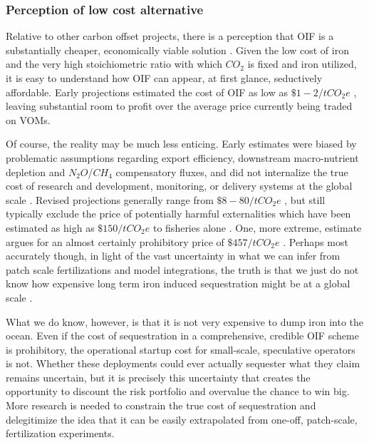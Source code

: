 \subsubsection{Perception of low cost alternative}

Relative to other carbon offset projects, there is a perception that OIF is a substantially cheaper, economically viable solution \parencite{KeithClimateStrategyCo22006,WorstallCheapWayDeal2012}. Given the low cost of iron and the very high stoichiometric ratio with which $CO_2$ is fixed and iron utilized, it is easy to understand how OIF can appear, at first glance, seductively affordable. Early projections estimated the cost of OIF as low as $\$1-2/tCO_2e$ \parencite{MarkelsSequestrationCarbonDioxide2002}, leaving substantial room to profit over the average price currently being traded on VOMs.

Of course, the reality may be much less enticing. Early estimates were biased by problematic assumptions regarding export efficiency, downstream macro-nutrient depletion and $N_2O$/$CH_4$ compensatory fluxes, and did not internalize the true cost of research and development, monitoring, or delivery systems at the global scale \parencite{WatsonDesigningnextgeneration2008}. Revised projections generally range from $\$8-80/tCO_2e$ \parencite{BoydImplicationslargescaleiron2008}, but still typically exclude the price of potentially harmful externalities which have been estimated as high as $\$150/tCO_2e$ to fisheries alone \parencite{GnanadesikanEffectspatchyocean2003}. One, more extreme, estimate argues for an almost certainly prohibitory price of $\$457/tCO_2e$ \parencite{Harrisonmethodestimatingcost2013}. Perhaps most accurately though, in light of the vast uncertainty in what we can infer from patch scale fertilizations and model integrations, the truth is that we just do not know how expensive long term iron induced sequestration might be at a global scale \parencite{BarkerChapter11Mitigation2007}.

What we do know, however, is that it is not very expensive to dump iron into the ocean. 
Even if the cost of sequestration in a comprehensive, credible OIF scheme is prohibitory, the operational startup cost for small-scale, speculative operators is not. Whether these deployments could ever actually sequester what they claim remains uncertain, but it is precisely this uncertainty that creates the opportunity to discount the risk portfolio and overvalue the chance to win big. More research is needed to constrain the true cost of sequestration and delegitimize the idea that it can be easily extrapolated from one-off, patch-scale, fertilization experiments. 

